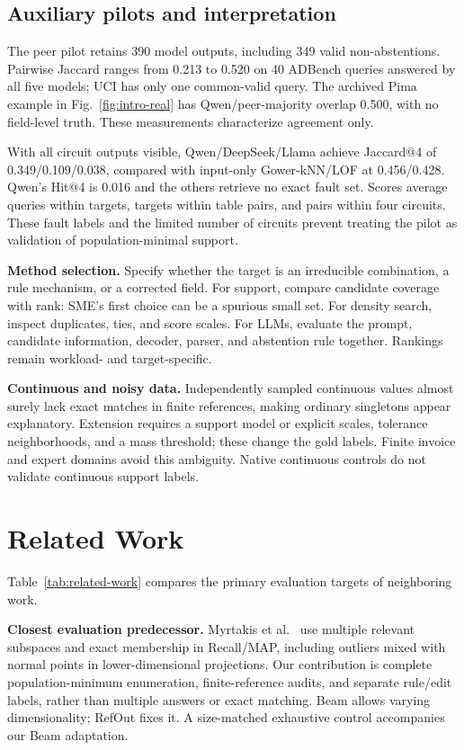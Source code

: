 \documentclass[conference]{IEEEtran}
\begin{document}
\subsection{Auxiliary pilots and interpretation}
The peer pilot retains 390 model outputs, including 349 valid non-abstentions. Pairwise Jaccard ranges from 0.213 to 0.520 on 40 ADBench queries answered by all five models; UCI has only one common-valid query. The archived Pima example in Fig.~\ref{fig:intro-real} has Qwen/peer-majority overlap 0.500, with no field-level truth. These measurements characterize agreement only.

With all circuit outputs visible, Qwen/DeepSeek/Llama achieve Jaccard@4 of 0.349/0.109/0.038, compared with input-only Gower-kNN/LOF at 0.456/0.428. Qwen's Hit@4 is 0.016 and the others retrieve no exact fault set. Scores average queries within targets, targets within table pairs, and pairs within four circuits. These fault labels and the limited number of circuits prevent treating the pilot as validation of population-minimal support.

\textbf{Method selection.} Specify whether the target is an irreducible combination, a rule mechanism, or a corrected field. For support, compare candidate coverage with rank: SME's first choice can be a spurious small set. For density search, inspect duplicates, ties, and score scales. For LLMs, evaluate the prompt, candidate information, decoder, parser, and abstention rule together. Rankings remain workload- and target-specific.

\textbf{Continuous and noisy data.} Independently sampled continuous values almost surely lack exact matches in finite references, making ordinary singletons appear explanatory. Extension requires a support model or explicit scales, tolerance neighborhoods, and a mass threshold; these change the gold labels. Finite invoice and expert domains avoid this ambiguity. Native continuous controls do not validate continuous support labels.

\section{Related Work}
Table~\ref{tab:related-work} compares the primary evaluation targets of neighboring work.

\textbf{Closest evaluation predecessor.} Myrtakis et al.~\cite{myrtakis2021comparative} use multiple relevant subspaces and exact membership in Recall/MAP, including outliers mixed with normal points in lower-dimensional projections. Our contribution is complete population-minimum enumeration, finite-reference audits, and separate rule/edit labels, rather than multiple answers or exact matching. Beam allows varying dimensionality; RefOut fixes it. A size-matched exhaustive control accompanies our Beam adaptation.
\end{document}

